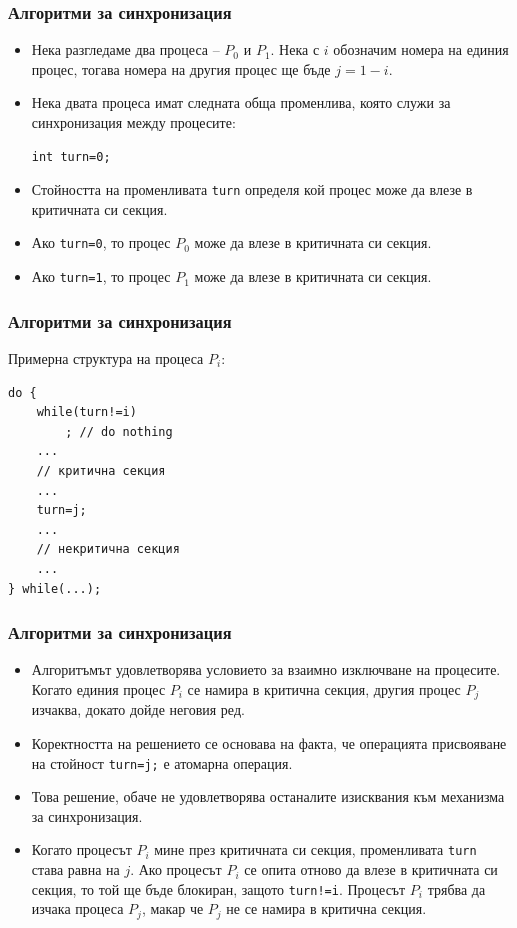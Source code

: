 \documentclass[ignorenonframetext, hyperref=unicode]{beamer}
\begin{document}
\begin{frame}[containsverbatim]
\frametitle{Алгоритми за синхронизация}
\begin{itemize}
  \item Нека разгледаме два процеса -- $P_0$ и $P_1$. Нека с $i$ обозначим
  номера на единия процес, тогава номера на другия процес ще бъде $j=1-i$.
  \item Нека двата процеса имат следната обща променлива, която служи за
  синхронизация между процесите:
\begin{lstlisting}[numbers=none]
int turn=0;
\end{lstlisting}
  \item Стойността на променливата \lstinline{turn} определя кой процес може да
  влезе в критичната си секция. 
  \item Ако \lstinline{turn=0}, то процес $P_0$ може да
  влезе в критичната си секция. 
  \item Ако \lstinline{turn=1}, то процес $P_1$ може да
  влезе в критичната си секция.
\end{itemize}
\end{frame}

\begin{frame}[containsverbatim]
\frametitle{Алгоритми за синхронизация}
Примерна структура на процеса $P_i$:
\begin{lstlisting}
do {
	while(turn!=i)
		; // do nothing
	...
	// критична секция
	...
	turn=j;
	...
	// некритична секция
	...
} while(...);
\end{lstlisting}
\end{frame}

\begin{frame}[containsverbatim]
\frametitle{Алгоритми за синхронизация}
\begin{itemize}
\item Алгоритъмът удовлетворява условието за взаимно изключване на процесите.
Когато единия процес $P_i$ се намира в критична секция, другия процес $P_j$
изчаква, докато дойде неговия ред.
\item Коректността на решението се основава на факта, че операцията присвояване
на стойност \lstinline{turn=j;} е атомарна операция.
\item Това решение, обаче не удовлетворява останалите изисквания към механизма
за синхронизация. 
\item Когато процесът $P_i$ мине през критичната си секция, променливата
\lstinline{turn} става равна на $j$. Ако процесът $P_i$ се опита отново да влезе
в критичната си секция, то той ще бъде блокиран, защото \lstinline{turn!=i}.
Процесът $P_i$ трябва да изчака процеса $P_j$, макар че $P_j$ не се намира в
критична секция.
\end{itemize}
\end{frame}
\end{document}

